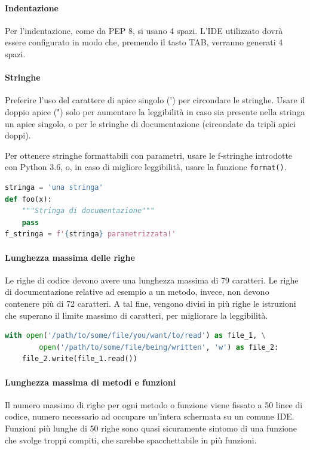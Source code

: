         \paragraph{Indentazione}
		Per l'indentazione, come da PEP 8, si usano 4 spazi. L'IDE utilizzato dovrà essere configurato in modo che, premendo il
		tasto TAB, verranno generati 4 spazi.

		\paragraph{Stringhe}
		Preferire l'uso del carattere di apice singolo (') per circondare le stringhe. Usare il doppio apice (") solo per aumentare la
		leggibilità in caso sia presente nella stringa un apice singolo, o per le stringhe di documentazione (circondate da tripli apici doppi).\par
		Per ottenere stringhe formattabili con parametri, usare le f-stringhe introdotte con Python 3.6, o, in caso di migliore leggibilità, usare la funzione \texttt{format()}.

\begin{lstlisting}[language=Python]
stringa = 'una stringa'
def foo(x):
	"""Stringa di documentazione"""
	pass
f_stringa = f'{stringa} parametrizzata!'
\end{lstlisting}

        \paragraph{Lunghezza massima delle righe}
		Le righe di codice devono avere una lunghezza massima di 79 caratteri. Le righe di documentazione relative ad esempio a un metodo,
		invece, non devono contenere più di 72 caratteri.
		A tal fine, vengono divisi in più righe le istruzioni che superano il limite massimo di caratteri, per migliorare la leggibilità.

		\begin{lstlisting}[language=Python]
with open('/path/to/some/file/you/want/to/read') as file_1, \
        open('/path/to/some/file/being/written', 'w') as file_2:
	file_2.write(file_1.read())
		\end{lstlisting}


		\paragraph{Lunghezza massima di metodi e funzioni}
		Il numero massimo di righe per ogni metodo o funzione viene fissato a 50 linee di codice, numero necessario ad occupare un'intera
		schermata su un comune IDE. Funzioni più lunghe di 50 righe sono quasi sicuramente sintomo di una funzione che svolge troppi compiti,
		che sarebbe spacchettabile in più funzioni.

